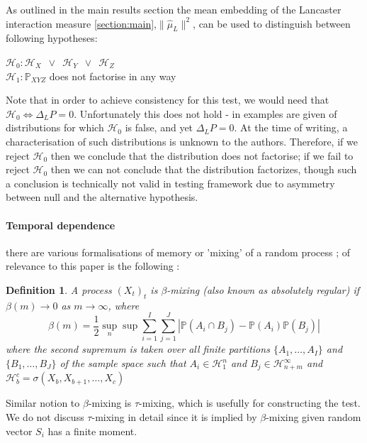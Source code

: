 \documentclass[]{article}
\newtheorem{definition}{Definition}
\begin{document}
As outlined in the main results section the mean embedding of the  Lancaster interaction measure \ref{section:main},$\|\hat \mu_L\|^2$, can be used  to distinguish  between following hypotheses:

$\mathcal{H}_0: \mathcal{H}_X \enspace \lor \enspace \mathcal{H}_Y \enspace \lor \enspace \mathcal{H}_Z $\\
$\mathcal{H}_1: \mathbb{P}_{XYZ}$ does not factorise in any way


Note that in order to achieve consistency for this test, we would need that $\mathcal{H}_0 \iff \Delta_LP = 0$. Unfortunately this does not hold - in \cite{sejdinovic2013kernel} examples are given of distributions for which $\mathcal{H}_0$ is false, and yet $\Delta_LP = 0$. At the time of writing, a characterisation of such distributions is unknown to the authors. Therefore, if we reject $\mathcal{H}_0$ then we conclude that the distribution does not factorise; if we fail to reject $\mathcal{H}_0$ then we can not conclude that the distribution factorizes, though such a conclusion is technically not valid in  testing framework due to asymmetry between null and the alternative hypothesis.   

\paragraph{Temporal dependence}
there are various formalisations of memory or 'mixing' of a random process \cite{doukhan1994mixing,bradley2005basic,dedecker2007weak}; of relevance to this paper is the following :


\begin{definition}
A process $(X_t)_{t}$ is \emph{$\beta$-mixing} (also known as \emph{absolutely regular}) if $\beta(m) \longrightarrow 0$ as $m\longrightarrow \infty$, where
\[ \beta(m) = \frac{1}{2} \sup_n \sup \sum_{i=1}^I \sum_{j=1}^J | \mathbb{P}(A_i \cap B_j) - \mathbb{P}(A_i)\mathbb{P}(B_j)| \]
where the second supremum is taken  over all finite partitions $\{A_1,\ldots, A_I \}$ and  $\{B_1,\ldots, B_J\}$ of the sample space such that $A_i \in \mathcal{H}_1^n$ and $B_j \in \mathcal{H}_{n+m}^\infty$ and $\mathcal{H}_b^c = \sigma(X_b,X_{b+1},\ldots,X_{c})$
\end{definition}
Similar notion to $\beta$-mixing is $\tau$-mixing, which is usefully for constructing the test. We do not discuss $\tau$-mixing in detail since it is implied by $\beta$-mixing given random vector $S_i$ has a finite moment.   
\end{document}
